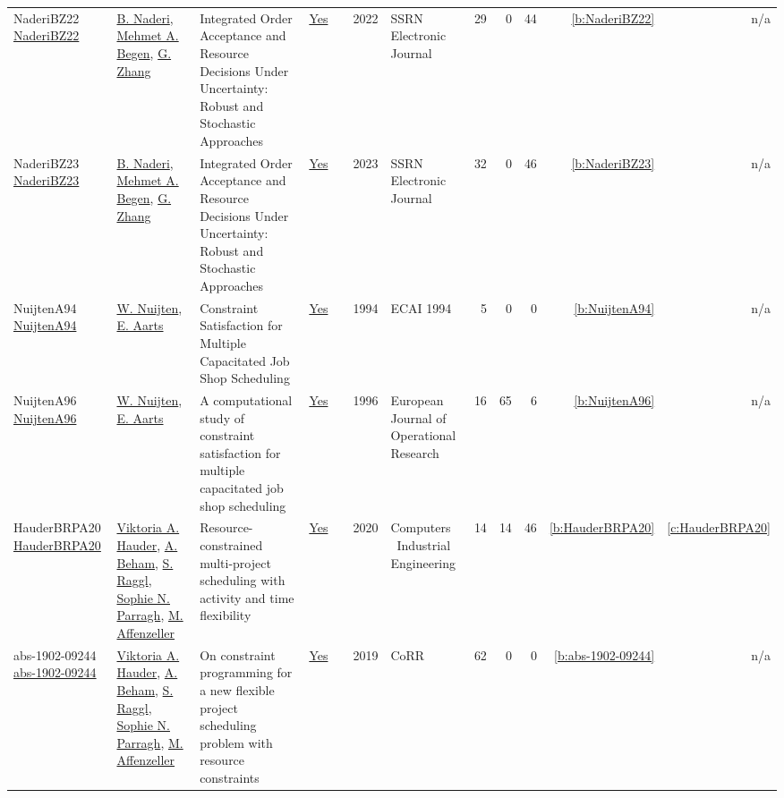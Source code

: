 {\begin{longtable}{>{\raggedright\arraybackslash}p{3cm}>{\raggedright\arraybackslash}p{6cm}>{\raggedright\arraybackslash}p{6.5cm}rrrp{2.5cm}rrrrr}
NaderiBZ22 \href{http://dx.doi.org/10.2139/ssrn.4140716}{NaderiBZ22} & \hyperref[auth:a729]{B. Naderi}, \hyperref[auth:a840]{Mehmet A. Begen}, \hyperref[auth:a841]{G. Zhang} & Integrated Order Acceptance and Resource Decisions Under Uncertainty: Robust and Stochastic Approaches & \href{../works/NaderiBZ22.pdf}{Yes} & \cite{NaderiBZ22} & 2022 & SSRN Electronic Journal & 29 & 0 & 44 & \ref{b:NaderiBZ22} & n/a\\
NaderiBZ23 \href{http://dx.doi.org/10.2139/ssrn.4494381}{NaderiBZ23} & \hyperref[auth:a729]{B. Naderi}, \hyperref[auth:a840]{Mehmet A. Begen}, \hyperref[auth:a841]{G. Zhang} & Integrated Order Acceptance and Resource Decisions Under Uncertainty: Robust and Stochastic Approaches & \href{../works/NaderiBZ23.pdf}{Yes} & \cite{NaderiBZ23} & 2023 & SSRN Electronic Journal & 32 & 0 & 46 & \ref{b:NaderiBZ23} & n/a\\
NuijtenA94 \href{}{NuijtenA94} & \hyperref[auth:a659]{W. Nuijten}, \hyperref[auth:a780]{E. Aarts} & Constraint Satisfaction for Multiple Capacitated Job Shop Scheduling & \href{../works/NuijtenA94.pdf}{Yes} & \cite{NuijtenA94} & 1994 & ECAI 1994 & 5 & 0 & 0 & \ref{b:NuijtenA94} & n/a\\
NuijtenA96 \href{http://dx.doi.org/10.1016/0377-2217(95)00354-1}{NuijtenA96} & \hyperref[auth:a659]{W. Nuijten}, \hyperref[auth:a780]{E. Aarts} & A computational study of constraint satisfaction for multiple capacitated job shop scheduling & \href{../works/NuijtenA96.pdf}{Yes} & \cite{NuijtenA96} & 1996 & European Journal of Operational Research & 16 & 65 & 6 & \ref{b:NuijtenA96} & n/a\\
HauderBRPA20 \href{http://dx.doi.org/10.1016/j.cie.2020.106857}{HauderBRPA20} & \hyperref[auth:a553]{Viktoria A. Hauder}, \hyperref[auth:a554]{A. Beham}, \hyperref[auth:a555]{S. Raggl}, \hyperref[auth:a556]{Sophie N. Parragh}, \hyperref[auth:a557]{M. Affenzeller} & Resource-constrained multi-project scheduling with activity and time flexibility & \href{../works/HauderBRPA20.pdf}{Yes} & \cite{HauderBRPA20} & 2020 & Computers \  Industrial Engineering & 14 & 14 & 46 & \ref{b:HauderBRPA20} & \ref{c:HauderBRPA20}\\
abs-1902-09244 \href{http://arxiv.org/abs/1902.09244}{abs-1902-09244} & \hyperref[auth:a553]{Viktoria A. Hauder}, \hyperref[auth:a554]{A. Beham}, \hyperref[auth:a555]{S. Raggl}, \hyperref[auth:a556]{Sophie N. Parragh}, \hyperref[auth:a557]{M. Affenzeller} & On constraint programming for a new flexible project scheduling problem with resource constraints & \href{../works/abs-1902-09244.pdf}{Yes} & \cite{abs-1902-09244} & 2019 & CoRR & 62 & 0 & 0 & \ref{b:abs-1902-09244} & n/a\\

\end{longtable}}
